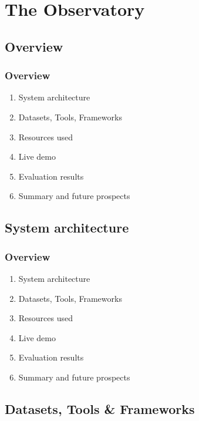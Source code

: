 \documentclass[11pt,t,usepdftitle=false,aspectratio=169]{beamer}
\begin{document}
\section{The Observatory}

\subsection{Overview}

\begin{frame}
\frametitle{Overview}

  
  \bigskip
  \begin{enumerate}
  	\item {System architecture}
  	\item Datasets, Tools, Frameworks
  	\item Resources used
  	\item {Live demo}
  	\item {Evaluation results}
  	\item Summary and future prospects
  \end{enumerate}

\end{frame}

\subsection{System architecture}

\begin{frame}
	\frametitle{Overview}
	
	
	\bigskip
	\begin{enumerate}
		\item {System architecture}
		\item Datasets, Tools, Frameworks
		\item Resources used
		\item {Live demo}
		\item {Evaluation results}
		\item Summary and future prospects
	\end{enumerate}
	
\end{frame}

\subsection{Datasets, Tools \& Frameworks}
\end{document}
